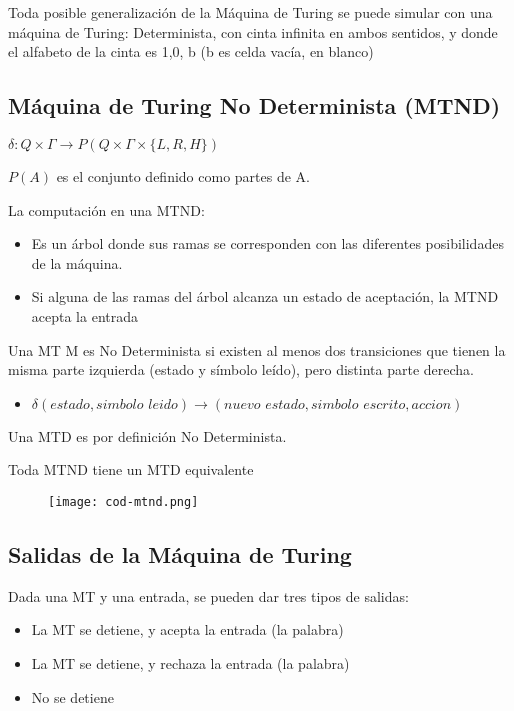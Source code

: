 Toda posible generalización de la Máquina de Turing se puede simular con una máquina de Turing: Determinista, con cinta infinita en ambos sentidos, y donde el alfabeto de la cinta es {1,0, b} (b es celda vacía, en blanco)

\subsection{Máquina de Turing No Determinista (MTND)}
$\delta: Q \times \Gamma \rightarrow P(Q\times \Gamma \times \{L, R, H\})$

$P(A)$ es el conjunto definido como partes de A.

La computación en una MTND:
\begin{itemize}
	\item Es un árbol donde sus ramas se corresponden con las diferentes posibilidades de la máquina.
	\item Si alguna de las ramas del árbol alcanza un estado de aceptación, la MTND acepta la entrada
\end{itemize}

Una MT M es No Determinista si existen al menos dos transiciones que tienen la misma parte izquierda (estado y símbolo leído), pero distinta parte derecha.
\begin{itemize}
	\item $\delta(\textit{estado},\textit{simbolo leido})\rightarrow (\textit{nuevo estado},\textit{simbolo escrito},\textit{accion})$
\end{itemize}

Una MTD es por definición No Determinista.

Toda MTND tiene un MTD equivalente

\begin{figure}[H]
	{\texttt{[image: cod-mtnd.png]}}
\end{figure}

\subsection{Salidas de la Máquina de Turing}
Dada una MT y una entrada, se pueden dar tres tipos de salidas:
\begin{itemize}
	\item La MT se detiene, y acepta la entrada (la palabra)
	\item La MT se detiene, y rechaza la entrada (la palabra)
	\item No se detiene
\end{itemize}

